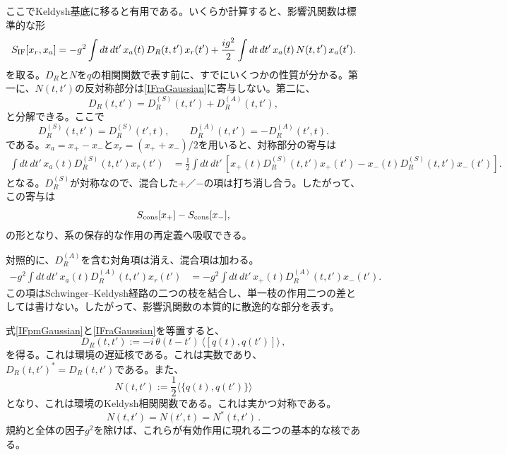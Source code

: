\documentclass[a4paper,11pt,oneside]{article}
\theoremstyle{definition}
\numberwithin{equation}{section}
\begin{document}
ここでKeldysh基底に移ると有用である。いくらか計算すると、影響汎関数は標準的な形
\begin{align}\label{IFraGaussian}
S_{\rm IF}[x_r,x_a]
=
- g^2\int dt\,dt'\,
x_a(t)\,D_R(t,t')\,x_r(t')
+\frac{i g^2}{2}\int dt\,dt'\,
x_a(t)\,N(t,t')\,x_a(t') .
\end{align}
を取る。\(D_R\)と\(N\)を\(q\)の相関関数で表す前に、すでにいくつかの性質が分かる。第一に、\(N(t,t')\)の反対称部分は\eqref{IFraGaussian}に寄与しない。第二に、
\begin{equation}
D_R(t,t')
=
D_R^{(S)}(t,t')+D_R^{(A)}(t,t'),
\end{equation}
と分解できる。ここで
\begin{equation}
D_R^{(S)}(t,t')=D_R^{(S)}(t',t),
\qquad
D_R^{(A)}(t,t')=-D_R^{(A)}(t',t).
\end{equation}
である。\(x_a=x_+-x_-\)と\(x_r=(x_++x_-)/2\)を用いると、対称部分の寄与は
\begin{align}
\int dt\,dt'\,
x_a(t)D_R^{(S)}(t,t')x_r(t')
&=
\frac{1}{2}\int dt\,dt'\,
\left[
x_+(t)D_R^{(S)}(t,t')x_+(t')
-
x_-(t)D_R^{(S)}(t,t')x_-(t')
\right]. \nonumber
\end{align}
となる。\(D_R^{(S)}\)が対称なので、混合した$ +  $／$ -  $の項は打ち消し合う。したがって、この寄与は
\begin{equation}
S_{\rm cons}[x_+]-S_{\rm cons}[x_-],
\end{equation}
の形となり、系の保存的な作用の再定義へ吸収できる。



対照的に、\(D_R^{(A)}\)を含む対角項は消え、混合項は加わる。
\begin{align}
- g^2\int dt\,dt'\,
x_a(t)D_R^{(A)}(t,t')x_r(t')
&=
- g^2\int dt\,dt'\,
x_+(t)D_R^{(A)}(t,t')x_-(t').
\end{align}
この項はSchwinger--Keldysh経路の二つの枝を結合し、単一枝の作用二つの差としては書けない。したがって、影響汎関数の本質的に散逸的な部分を表す。



式\eqref{IFpmGaussian}と\eqref{IFraGaussian}を等置すると、
\begin{equation}
D_R(t,t')
:=
-i\,\theta(t-t')\,\langle [q(t),q(t')]\rangle\,,
\end{equation}
を得る。これは環境の遅延核である。これは実数であり、$ D_R(t,t')^* = D_R(t,t')   $である。また、
\begin{equation}
N(t,t')
:=
\frac12\langle \{q(t),q(t')\}\rangle
\end{equation}
となり、これは環境のKeldysh相関関数である。これは実かつ対称である。
\[ N(t,t')=N(t',t)=N^{*}(t,t') \,. \]
規約と全体の因子\(g^2\)を除けば、これらが有効作用に現れる二つの基本的な核である。
\end{document}
